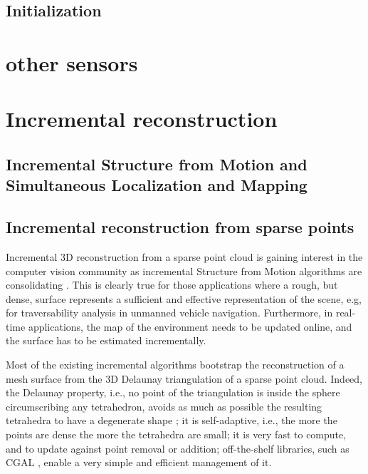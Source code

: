 \subsection{Initialization}
\section{other sensors}


\section{Incremental reconstruction}
\subsection{Incremental Structure from Motion and Simultaneous Localization and Mapping}

\subsection{Incremental reconstruction from sparse points}
Incremental 3D reconstruction from a sparse point cloud is gaining interest in the computer vision community as incremental Structure from Motion algorithms are consolidating  \cite{wu13}. 
This is clearly true for those applications where a rough, but dense, surface represents a sufficient and effective representation of the scene, e.g, for traversability analysis in unmanned vehicle navigation. 
Furthermore, in real-time applications, the map of the environment needs to be updated online, and the surface has to be estimated incrementally. 

Most of the existing incremental algorithms \cite{Lovi_et_al_11,Pan_et_al09,litvinov_lhuillier_13,litvinov_Lhiuller14} bootstrap the reconstruction of a mesh surface from the 3D Delaunay triangulation of a sparse point cloud. Indeed, the Delaunay property, i.e., no point of the triangulation is inside the sphere circumscribing any tetrahedron, avoids as much as possible the resulting tetrahedra to have a degenerate shape \cite{Maur_02}; it is self-adaptive, i.e., the more the points are dense the more the tetrahedra are small; it is very fast to compute, and to  update against point removal or addition; off-the-shelf libraries, such as CGAL \cite{cgal}, enable a very simple and efficient management of it. 

